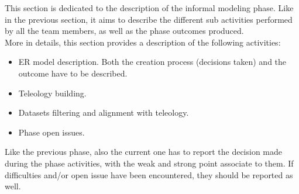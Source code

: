 This section is dedicated to the description of the informal modeling phase. Like in the previous section, it aims to describe the different sub activities performed by all the team members, as well as the phase outcomes produced.\\

\noindent More in details, this section provides a description of the following activities:
\begin{itemize}
    \item ER model description. Both the creation process (decisions taken) and the outcome have to be described.
    \item Teleology building.
    \item Datasets filtering and alignment with teleology.
    \item Phase open issues.
\end{itemize}

\noindent Like the previous phase, also the current one has to report the decision made during the phase activities, with the weak and strong point associate to them. If difficulties and/or open issue have been encountered, they should be reported as well.
